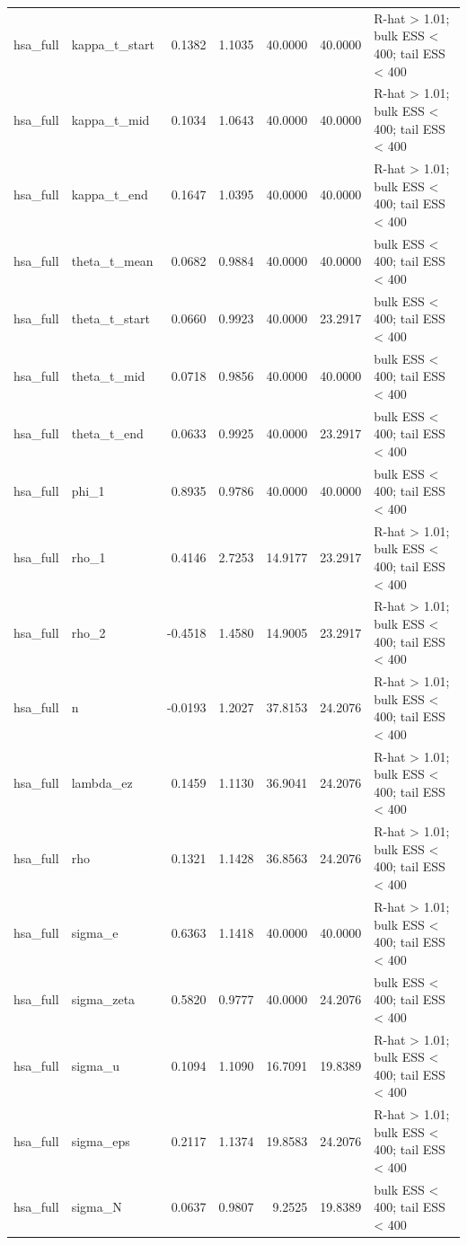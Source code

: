 \begin{tabular}{llrrrrl}
hsa\_full & kappa\_t\_start & 0.1382 & 1.1035 & 40.0000 & 40.0000 & R-hat > 1.01; bulk ESS < 400; tail ESS < 400 \\
hsa\_full & kappa\_t\_mid & 0.1034 & 1.0643 & 40.0000 & 40.0000 & R-hat > 1.01; bulk ESS < 400; tail ESS < 400 \\
hsa\_full & kappa\_t\_end & 0.1647 & 1.0395 & 40.0000 & 40.0000 & R-hat > 1.01; bulk ESS < 400; tail ESS < 400 \\
hsa\_full & theta\_t\_mean & 0.0682 & 0.9884 & 40.0000 & 40.0000 & bulk ESS < 400; tail ESS < 400 \\
hsa\_full & theta\_t\_start & 0.0660 & 0.9923 & 40.0000 & 23.2917 & bulk ESS < 400; tail ESS < 400 \\
hsa\_full & theta\_t\_mid & 0.0718 & 0.9856 & 40.0000 & 40.0000 & bulk ESS < 400; tail ESS < 400 \\
hsa\_full & theta\_t\_end & 0.0633 & 0.9925 & 40.0000 & 23.2917 & bulk ESS < 400; tail ESS < 400 \\
hsa\_full & phi\_1 & 0.8935 & 0.9786 & 40.0000 & 40.0000 & bulk ESS < 400; tail ESS < 400 \\
hsa\_full & rho\_1 & 0.4146 & 2.7253 & 14.9177 & 23.2917 & R-hat > 1.01; bulk ESS < 400; tail ESS < 400 \\
hsa\_full & rho\_2 & -0.4518 & 1.4580 & 14.9005 & 23.2917 & R-hat > 1.01; bulk ESS < 400; tail ESS < 400 \\
hsa\_full & n & -0.0193 & 1.2027 & 37.8153 & 24.2076 & R-hat > 1.01; bulk ESS < 400; tail ESS < 400 \\
hsa\_full & lambda\_ez & 0.1459 & 1.1130 & 36.9041 & 24.2076 & R-hat > 1.01; bulk ESS < 400; tail ESS < 400 \\
hsa\_full & rho & 0.1321 & 1.1428 & 36.8563 & 24.2076 & R-hat > 1.01; bulk ESS < 400; tail ESS < 400 \\
hsa\_full & sigma\_e & 0.6363 & 1.1418 & 40.0000 & 40.0000 & R-hat > 1.01; bulk ESS < 400; tail ESS < 400 \\
hsa\_full & sigma\_zeta & 0.5820 & 0.9777 & 40.0000 & 24.2076 & bulk ESS < 400; tail ESS < 400 \\
hsa\_full & sigma\_u & 0.1094 & 1.1090 & 16.7091 & 19.8389 & R-hat > 1.01; bulk ESS < 400; tail ESS < 400 \\
hsa\_full & sigma\_eps & 0.2117 & 1.1374 & 19.8583 & 24.2076 & R-hat > 1.01; bulk ESS < 400; tail ESS < 400 \\
hsa\_full & sigma\_N & 0.0637 & 0.9807 & 9.2525 & 19.8389 & bulk ESS < 400; tail ESS < 400 \\

\end{tabular}
